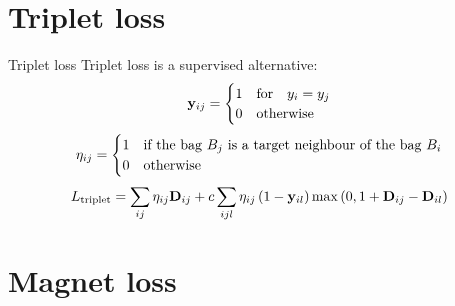 \documentclass[10pt]{beamer}
\newcommand{\mathmat}{\ensuremath{\mathbf}}
\begin{document}
\section{Triplet loss}

\begin{frame}{Triplet loss}
	Triplet loss is a supervised alternative:
	\[ \mathmat{y}_{ij} =
		\begin{cases}
			1 &\text{for} \quad y_i = y_j \\
			0 &\text{otherwise}
		\end{cases}
	\]
	\[ \mathmat{\eta}_{ij} = \begin{cases}
		1 &\text{if the bag } B_j \text{ is a target neighbour of the bag } B_i \\
		0 &\text{otherwise}
	\end{cases} \]
	\[ L_\mathrm{triplet} = \sum_{ij} \eta_{ij} \mathmat{D}_{ij} + c \sum_{ijl} \eta_{ij} \left( 1 - \mathmat{y}_{il} \right) \max \left( 0, 1 + \mathmat{D}_{ij} - \mathmat{D}_{il} \right) \]
\end{frame}

\section{Magnet loss}
\end{document}
